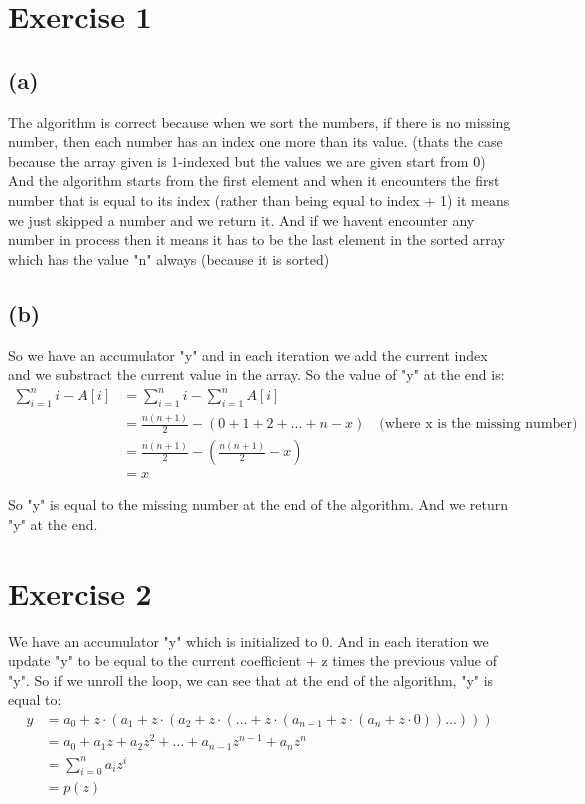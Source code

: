 \documentclass{article}
\begin{document}
\section*{Exercise 1}

\subsection*{(a)}
The algorithm is correct because when we sort the numbers, if there is no missing number, then each number has an index one more than its value.
(thats the case because the array given is 1-indexed but the values we are given start from 0)
And the algorithm starts from the first element and when it encounters the first number that is equal to its index (rather than being equal to index + 1) it means we just skipped
a number and we return it. And if we havent encounter any number in process then it means it has to be the last element in the sorted array which has the value "n" always (because it is sorted)

\subsection*{(b)}
So we have an accumulator "y" and in each iteration we add the current index and we substract the current value in the array. So the value of "y"
at the end is:
\begin{align*}
   \sum_{i = 1}^{n} i - A[i] &= \sum_{i = 1}^{n} i - \sum_{i = 1}^{n} A[i] \\
   &= \frac{n(n+1)}{2} - \left(0 + 1 + 2 + ... + n - x\right) \quad \text{(where x is the missing number)} \\
   &= \frac{n(n+1)}{2} - \left(\frac{n(n+1)}{2} - x\right) \\
   &= x
\end{align*}

So "y" is equal to the missing number at the end of the algorithm. And we return "y" at the end.

\section*{Exercise 2}
We have an accumulator "y" which is initialized to 0. And in each iteration we update "y" to be equal to the current coefficient + z times the previous value of "y".
So if we unroll the loop, we can see that at the end of the algorithm, "y" is equal to:
\begin{align*}
   y &= a_0 + z \cdot (a_1 + z \cdot (a_2 + z \cdot (... + z \cdot (a_{n-1} + z \cdot (a_n + z \cdot 0))...))) \\
   &= a_0 + a_1 z + a_2 z^2 + ... + a_{n-1} z^{n-1} + a_n z^n \\
   &= \sum_{i=0}^{n} a_i z^i \\
   &= p(z)
\end{align*}
\end{document}
